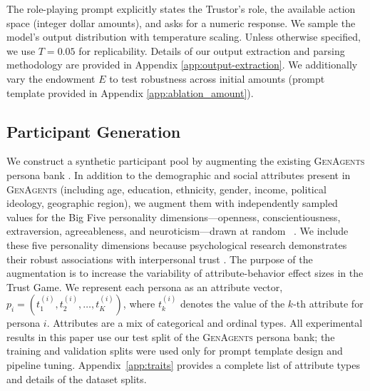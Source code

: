 \documentclass{article} %
\begin{document}
The role-playing prompt explicitly states the Trustor's role, the available action space (integer dollar amounts), and asks for a numeric response. We sample the model's output distribution with temperature scaling. Unless otherwise specified, we use $T{=}0.05$ for replicability. Details of our output extraction and parsing methodology are provided in Appendix \ref{app:output-extraction}. We additionally vary the endowment $E$ to test robustness across initial amounts (prompt template provided in Appendix \ref{app:ablation_amount}).

\subsection{Participant Generation}
\label{subsec:participant_gen}

We construct a synthetic participant pool by augmenting the existing \textsc{GenAgents} persona bank \citep{park2024generative}. In addition to the demographic and social attributes present in \textsc{GenAgents} (including age, education, ethnicity, gender, income, political ideology, geographic region), we augment them with independently sampled values for the Big Five personality dimensions—openness, conscientiousness, extraversion, agreeableness, and neuroticism—drawn at random ~\citep{deyoung2007between}. We include these five personality dimensions because psychological research demonstrates their robust associations with interpersonal trust \citep{sharan2020effects, bartosik2021you, evans2008survey}. The purpose of the augmentation is to increase the variability of attribute-behavior effect sizes in the Trust Game. We represent each persona as an attribute vector, $p_i = (t_1^{(i)}, t_2^{(i)}, \ldots, t_K^{(i)})$, where $t_k^{(i)}$ denotes the value of the $k$-th attribute for persona $i$. Attributes are a mix of categorical and ordinal types. All experimental results in this paper use our test split of the \textsc{GenAgents} persona bank; the training and validation splits were used only for prompt template design and pipeline tuning. Appendix~\ref{app:traits} provides a complete list of attribute types and details of the dataset splits.
\end{document}
